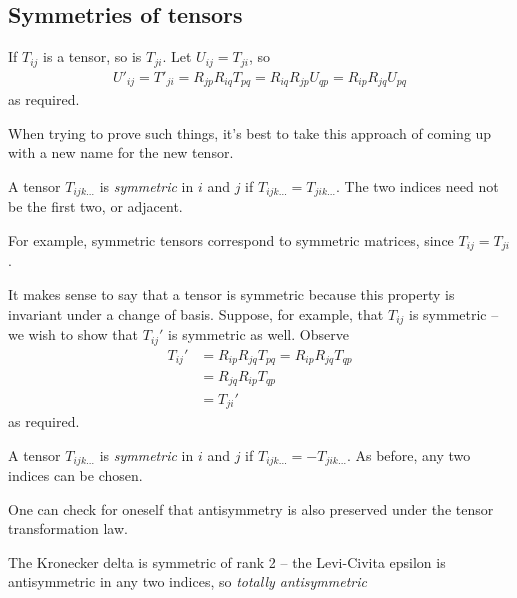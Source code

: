 \documentclass{../template/note}
\begin{document}
    \subsection{Symmetries of tensors}

    If \(T_{ij}\) is a tensor, so is \(T_{ji}\). Let \(U_{ij} = T_{ji}\), so
    \begin{align*}
        U'_{ij} = T'_{ji} = R_{jp}R_{iq}T_{pq} = R_{iq}R_{jp}U_{qp} = R_{ip}R_{jq}U_{pq}
    \end{align*}
    as required.
    
    \begin{remark*}
        When trying to prove such things, it's best to take this approach of coming up with a new name for the new tensor.
    \end{remark*}
    
    \begin{definition*}
        A tensor \(T_{ijk\dots}\) is \emph{symmetric} in \(i\) and \(j\) if \(T_{ijk\dots} = T_{jik\dots}\). The two indices need not be the first two, or adjacent.
    \end{definition*}
    
    For example, symmetric tensors correspond to symmetric matrices, since \(T_{ij} = T_{ji}\).

    It makes sense to say that a tensor is symmetric because this property is invariant under a change of basis. Suppose, for example, that \(T_{ij}\) is symmetric -- we wish to show that \(T_{ij}'\) is symmetric as well. Observe
    \begin{align*}
        T_{ij}' &= R_{ip}R_{jq}T_{pq} = R_{ip}R_{jq}T_{qp} \\
        &= R_{jq}R_{ip}T_{qp} \\
        &= T_{ji}'
    \end{align*}
    as required.

    \begin{definition*}
        A tensor \(T_{ijk\dots}\) is \emph{symmetric} in \(i\) and \(j\) if \(T_{ijk\dots} = -T_{jik\dots}\). As before, any two indices can be chosen.
    \end{definition*}
    
    One can check for oneself that antisymmetry is also preserved under the tensor transformation law.

    \begin{example*}
        The Kronecker delta is symmetric of rank 2 -- the Levi-Civita epsilon is antisymmetric in any two indices, so \emph{totally antisymmetric}
    \end{example*}
    
\end{document}
